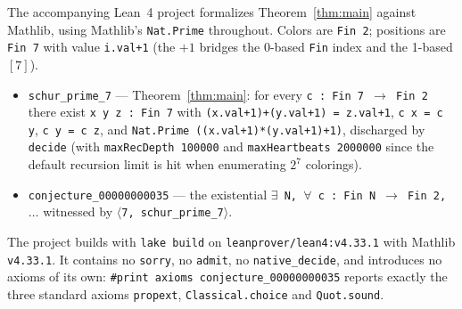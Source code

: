 \documentclass[11pt]{article}
\theoremstyle{plain}
\theoremstyle{definition}
\theoremstyle{remark}
\begin{document}
The accompanying Lean~4 project formalizes Theorem~\ref{thm:main} against
Mathlib, using Mathlib's \texttt{Nat.Prime} throughout. Colors are
\texttt{Fin~2}; positions are \texttt{Fin~7} with value \texttt{i.val+1}
(the $+1$ bridges the 0-based \texttt{Fin} index and the 1-based $[7]$).

\begin{itemize}
  \item \texttt{schur\_prime\_7} --- Theorem~\ref{thm:main}: for every
    \texttt{c : Fin 7 $\to$ Fin 2} there exist \texttt{x y z : Fin 7} with
    \texttt{(x.val+1)+(y.val+1) = z.val+1}, \texttt{c x = c y},
    \texttt{c y = c z}, and
    \texttt{Nat.Prime ((x.val+1)*(y.val+1)+1)}, discharged by
    \texttt{decide} (with \texttt{maxRecDepth 100000} and
    \texttt{maxHeartbeats 2000000} since the default recursion limit is hit
    when enumerating $2^7$ colorings).
  \item \texttt{conjecture\_00000000035} --- the existential
    \texttt{$\exists$ N, $\forall$ c : Fin N $\to$ Fin 2, $\dots$} witnessed by
    \texttt{$\langle$7, schur\_prime\_7$\rangle$}.
\end{itemize}

The project builds with \texttt{lake build} on
\texttt{leanprover/lean4:v4.33.1} with Mathlib \texttt{v4.33.1}. It contains
no \texttt{sorry}, no \texttt{admit}, no \texttt{native\_decide}, and
introduces no axioms of its own:
\texttt{\#print axioms conjecture\_00000000035} reports exactly the three
standard axioms \texttt{propext}, \texttt{Classical.choice} and
\texttt{Quot.sound}.
\end{document}

